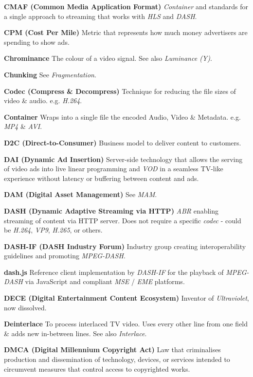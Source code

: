 \smallskip
\textbf{CMAF (Common Media Application Format)}
\textit{Container} and standards for a single approach to streaming that works with \textit{HLS} and \textit{DASH}.

\smallskip
\textbf{CPM (Cost Per Mile)}
Metric that represents how much money advertisers are spending to show ads.

\smallskip
\textbf{Chrominance}
The colour of a video signal. See also \textit{Luminance (Y)}.

\smallskip
\textbf{Chunking}
See \textit{Fragmentation}.

\smallskip
\textbf{Codec (Compress \& Decompress)}
Technique for reducing the file sizes of video \& audio. e.g. \textit{H.264}.

\smallskip
\textbf{Container}
Wraps into a single file the encoded Audio, Video \& Metadata.  e.g. \textit{MP4} \& \textit{AVI}.

\smallskip
\textbf{D2C (Direct-to-Consumer)}
Business model to deliver content to customers.

\smallskip
\textbf{DAI (Dynamic Ad Insertion)}
Server-side technology that allows the serving of video ads into live linear programming and \textit{VOD} in a seamless TV-like experience without latency or buffering between content and ads.

\smallskip
\textbf{DAM (Digital Asset Management)}
See \textit{MAM}.

\smallskip
\textbf{DASH (Dynamic Adaptive Streaming via HTTP)}
\textit{ABR} enabling streaming of content via HTTP server. Does not require a specific \textit{codec} - could be \textit{H.264}, \textit{VP9}, \textit{H.265}, or others.

\smallskip
\textbf{DASH-IF (DASH Industry Forum)}
Industry group creating interoperability guidelines and promoting \textit{MPEG-DASH}.

\smallskip
\textbf{dash.js}
Reference client implementation by \textit{DASH-IF} for the playback of \textit{MPEG-DASH} via JavaScript and compliant \textit{MSE} / \textit{EME} platforms.

\smallskip
\textbf{DECE (Digital Entertainment Content Ecosystem)}
Inventor of \textit{Ultraviolet}, now dissolved.

\smallskip
\textbf{Deinterlace}
To process interlaced TV video. Uses every other line from one field \& adds new in-between lines. See also \textit{Interlace}.

\smallskip
\textbf{DMCA (Digital Millennium Copyright Act)}
Law that criminalises production and dissemination of technology, devices, or services intended to circumvent measures that control access to copyrighted works.

